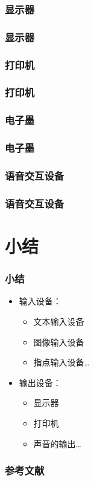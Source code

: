 \documentclass{beamer}
\begin{document}
\subsubsection{显示器}
\begin{frame}
	\frametitle{显示器}

\end{frame}

\subsubsection{打印机}
\begin{frame}
	\frametitle{打印机}

\end{frame}

\subsubsection{电子墨}
\begin{frame}
	\frametitle{电子墨}

\end{frame}

\subsubsection{语音交互设备}
\begin{frame}
	\frametitle{语音交互设备}

\end{frame}

\section{小结}
\begin{frame}
	\frametitle{小结}
	\begin{itemize}
		\item 输入设备：
		\begin{itemize}
			\item 文本输入设备
			\item 图像输入设备
			\item 指点输入设备\dots
		\end{itemize}
		\item 输出设备：
		\begin{itemize}
			\item 显示器 
			\item 打印机
			\item 声音的输出\dots
		\end{itemize}
	\end{itemize}
\end{frame}
 
\begin{frame}
	\frametitle{参考文献}
	
	
\end{frame}
\end{document}
